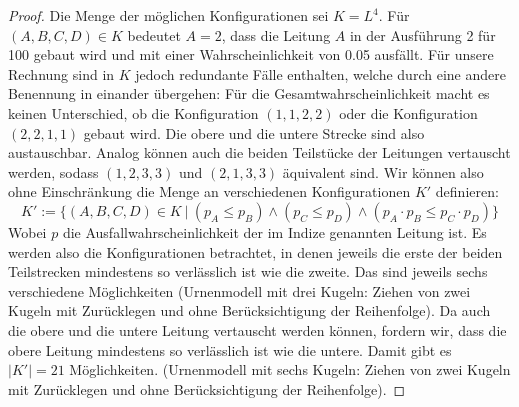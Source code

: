 \documentclass[a4paper]{scrartcl}
\begin{document}
\begin{enumerate}[label=\bfseries\arabic*.]
\begin{proof}
                    Die Menge der möglichen Konfigurationen sei $K = L^4$.
                    Für $(A, B, C, D) \in K$ bedeutet $A = 2$, dass die 
                    Leitung $A$ in der Ausführung 2 für 100 \EUR gebaut wird und
                    mit einer Wahrscheinlichkeit von \num{0,05} ausfällt.
                    Für unsere Rechnung sind in $K$ jedoch redundante Fälle
                    enthalten, welche durch eine andere Benennung in einander
                    übergehen:
                    Für die Gesamtwahrscheinlichkeit macht es keinen Unterschied, ob
                    die Konfiguration $(1, 1, 2, 2)$ oder die Konfiguration
                    $(2, 2, 1, 1)$ gebaut wird.
                    Die obere und die untere Strecke sind also austauschbar.
                    Analog können auch die beiden Teilstücke der Leitungen
                    vertauscht werden, sodass $(1, 2, 3, 3)$ und $(2, 1, 3, 3)$
                    äquivalent sind.
                    Wir können also ohne Einschränkung die Menge an
                    verschiedenen Konfigurationen $K'$ definieren:
                    \begin{equation*}
                        K' := \Big\{ 
                            (A, B, C, D) \in K \ |\ 
                            (p_A \leq p_B) \land (p_C \leq p_D) \land
                            (p_A \cdot p_B \leq p_C \cdot p_D)
                        \Big\}
                    \end{equation*}
                    Wobei $p$ die Ausfallwahrscheinlichkeit der im Indize
                    genannten Leitung ist.
                    Es werden also die Konfigurationen betrachtet, in denen
                    jeweils die erste der beiden Teilstrecken mindestens so
                    verlässlich ist wie die zweite.
                    Das sind jeweils sechs verschiedene Möglichkeiten
                    (Urnenmodell mit drei Kugeln: Ziehen von zwei Kugeln mit
                    Zurücklegen und ohne Berücksichtigung der Reihenfolge).
                    Da auch die obere und die untere Leitung vertauscht werden
                    können, fordern wir, dass die obere Leitung mindestens so
                    verlässlich ist wie die untere.
                    Damit gibt es $|K'| = 21$ Möglichkeiten.
                    (Urnenmodell mit sechs Kugeln: Ziehen von zwei Kugeln mit
                    Zurücklegen und ohne Berücksichtigung der Reihenfolge).


\end{proof}
\end{enumerate}
\end{document}
